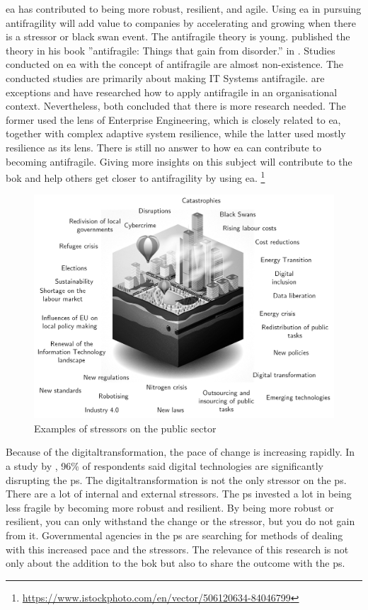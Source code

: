 \acrshort{ea} has contributed to being more \gls{robust}, \gls{resilient}, and \gls{agile}. Using \acrshort{ea} in pursuing \gls{antifragility} will add value to companies by accelerating and growing when there is a stressor or black swan event. The \gls{antifragile} theory is young.  \citeauthor{Taleb2012} published the theory in his book ''\Gls{antifragile}: Things that gain from disorder.'' in \citeyear{Taleb2012}.  Studies conducted on \acrshort{ea} with the concept of \gls{antifragile} are almost non-existence. The conducted studies are primarily about making IT Systems \gls{antifragile}. \textcite{Botjes2020,Kastner2017} are exceptions and have researched how to apply \gls{antifragile} in an organisational context. Nevertheless, both concluded that there is more research needed. The former used the lens of Enterprise Engineering, which is closely related to \acrshort{ea}, together with complex adaptive system resilience, while the latter used mostly resilience as its lens. There is still no answer to how \acrshort{ea} can contribute to becoming \gls{antifragile}. Giving more insights on this subject will contribute to the \acrshort{bok} and help others get closer to \gls{antifragility} by using \acrshort{ea}.
{\let\thefootnote\relax\footnote{{\url{https://www.istockphoto.com/en/vector/506120634-84046799}}}}
\begin{figure}[H]
	\centering
	\includegraphics[width=0.8\linewidth]{images/publicstressors}
	\caption[Examples of stressors on the public sector]{Examples of stressors on the public sector}
	\label{fig:publicstressors}
\end{figure}

Because of the \gls{digitaltransformation}, the pace of change is increasing rapidly. In a study by \textcite{Eggers2015}, 96\% of respondents said digital technologies are significantly disrupting the \gls{ps}. The \gls{digitaltransformation} is not the only \gls{stressor} on the \gls{ps}. There are a lot of internal and external \glspl{stressor}. The \gls{ps} invested a lot in being less \gls{fragile} by becoming more \gls{robust} and \gls{resilient}. By being more \gls{robust} or \gls{resilient}, you can only withstand the change or the \gls{stressor}, but you do not gain from it. Governmental agencies in the \gls{ps} are searching for methods of dealing with this increased pace and the stressors. The relevance of this research is not only about the addition to the \acrshort{bok} but also to share the outcome with the \gls{ps}.